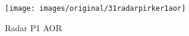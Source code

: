 \begin{figure}[!h] 
\centering 
\texttt{[image: images/original/31radarpirker1aor]}
\caption{Radar P1 AOR}
\label{fig:31radarpirker1aor} 
\end{figure}

